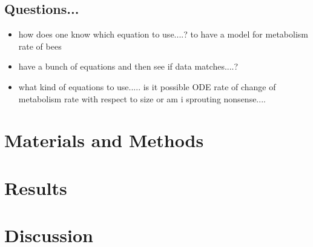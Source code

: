\documentclass[12pt]{article}
\begin{document}
\subsection{Questions...}
\begin{itemize}
	\item how does one know which equation to use....? to have a model for metabolism rate of bees
	\item have a bunch of equations and then see if data matches....?
	\item what kind of equations to use..... is it possible ODE rate of change of metabolism rate with respect to size or am i sprouting nonsense....
\end{itemize}

	



\newpage
\section{Materials and Methods} 


\newpage
\section{Results} 


\newpage
\section{Discussion} 


\newpage


\end{document}
